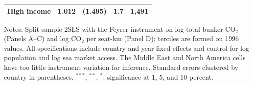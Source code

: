 \documentclass[12pt]{article}
\begin{document}
\begin{table}[H]
{\begin{threeparttable}
\begin{tabular}{lcccc}
  High income & 1.012 & (1.495) & 1.7 & 1,491 \\
\bottomrule
\end{tabular}
\begin{tablenotes}[flushleft]
\footnotesize
\item Notes: Split-sample 2SLS with the Feyrer instrument on log total bunker CO$_2$ (Panels A--C) and log CO$_2$ per seat-km (Panel D); terciles are formed on 1996 values. All specifications include country and year fixed effects and control for log population and log sea market access. The Middle East and North America cells have too little instrument variation for inference. Standard errors clustered by country in parentheses. $^{***}$, $^{**}$, $^{*}$: significance at 1, 5, and 10 percent.
\end{tablenotes}
\end{threeparttable}}
\end{table}
\end{document}
